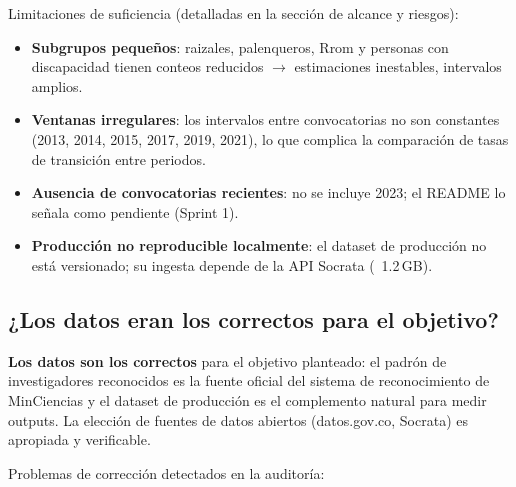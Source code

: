 Limitaciones de suficiencia (detalladas en la sección de alcance y riesgos):

\begin{itemize}
  \item \textbf{Subgrupos pequeños}: raizales, palenqueros, Rrom y personas con
        discapacidad tienen conteos reducidos $\rightarrow$ estimaciones inestables,
        intervalos amplios.
  \item \textbf{Ventanas irregulares}: los intervalos entre convocatorias no son
        constantes (2013, 2014, 2015, 2017, 2019, 2021), lo que complica la
        comparación de tasas de transición entre periodos.
  \item \textbf{Ausencia de convocatorias recientes}: no se incluye 2023; el
        README lo señala como pendiente (Sprint 1).
  \item \textbf{Producción no reproducible localmente}: el dataset de producción
        no está versionado; su ingesta depende de la API Socrata (~1.2\,GB).
\end{itemize}

\subsection{¿Los datos eran los correctos para el objetivo?}

\begin{tcolorbox}[hallazgo]
\textbf{Los datos son los correctos} para el objetivo planteado: el padrón de
investigadores reconocidos es la fuente oficial del sistema de reconocimiento de
MinCiencias y el dataset de producción es el complemento natural para medir
outputs. La elección de fuentes de datos abiertos (datos.gov.co, Socrata) es
apropiada y verificable.
\end{tcolorbox}

Problemas de corrección detectados en la auditoría:

